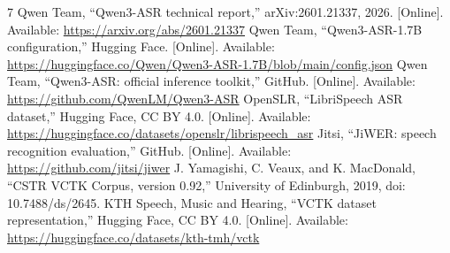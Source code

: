 \documentclass[conference]{IEEEtran}
\begin{document}
\begin{thebibliography}{7}
 Qwen Team, ``Qwen3-ASR technical report,'' arXiv:2601.21337, 2026. [Online]. Available: \url{https://arxiv.org/abs/2601.21337}
 Qwen Team, ``Qwen3-ASR-1.7B configuration,'' Hugging Face. [Online]. Available: \url{https://huggingface.co/Qwen/Qwen3-ASR-1.7B/blob/main/config.json}
 Qwen Team, ``Qwen3-ASR: official inference toolkit,'' GitHub. [Online]. Available: \url{https://github.com/QwenLM/Qwen3-ASR}
 OpenSLR, ``LibriSpeech ASR dataset,'' Hugging Face, CC BY 4.0. [Online]. Available: \url{https://huggingface.co/datasets/openslr/librispeech_asr}
 Jitsi, ``JiWER: speech recognition evaluation,'' GitHub. [Online]. Available: \url{https://github.com/jitsi/jiwer}
 J. Yamagishi, C. Veaux, and K. MacDonald, ``CSTR VCTK Corpus, version 0.92,'' University of Edinburgh, 2019, doi: 10.7488/ds/2645.
 KTH Speech, Music and Hearing, ``VCTK dataset representation,'' Hugging Face, CC BY 4.0. [Online]. Available: \url{https://huggingface.co/datasets/kth-tmh/vctk}
\end{thebibliography}
\end{document}
